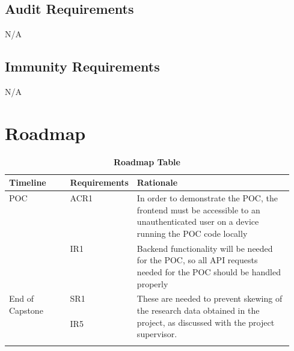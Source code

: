 \documentclass{article}
\begin{document}
\subsection{Audit Requirements}
N/A
\subsection{Immunity Requirements}
N/A



\section{Roadmap}
\begin{table}[H]
\renewcommand{\arraystretch}{1.75}
\begin{adjustwidth}{-1.6in}{-1in}
\caption{\bf Roadmap Table}
\centering
\begin{tabular}{|l|l|p{0.55\linewidth}|}
\hline
\textbf{Timeline}                & \textbf{Requirements} & \textbf{Rationale}                                                                                                                                                                                                              \\ \hline
\multirow{2}{*}{POC}             & ACR1                  & In order to demonstrate the POC, the frontend must be accessible to an unauthenticated user on a device running the POC code locally                                                                                            \\ \cline{2-3} 
                                 & IR1                   & Backend functionality will be needed for the POC, so all API requests needed for the POC should be handled properly                                                                                                             \\ \hline
\multirow{9}{*}{End of Capstone} & SR1                   & \multirow{2}{\linewidth}{These are needed to prevent skewing of the research data obtained in the project, as discussed with the project supervisor.}                                                                                    \\ \cline{2-2}
                                 &IR5                   &                                                                                                                                                                                                                              \\ \cline{2-3}

\end{tabular}
\end{adjustwidth}
\end{table}
\end{document}
